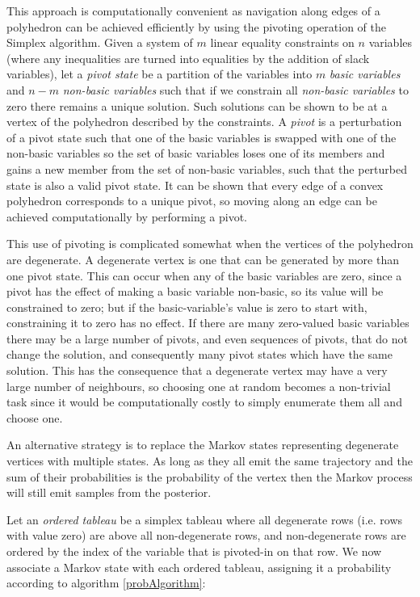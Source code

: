 \documentclass{article}
\begin{document}
This approach is computationally convenient as navigation along edges of a polyhedron can be achieved efficiently by using the pivoting operation of the Simplex algorithm\cite{dantzig1955generalized}\cite{thie2011introduction}. Given a system of $m$ linear equality constraints on $n$ variables (where any inequalities are turned into equalities by the addition of slack variables), let a \textit{pivot state} be a partition of the variables into $m$ \textit{basic variables} and $n-m$ \textit{non-basic variables} such that if we constrain all \textit{non-basic variables} to zero there remains a unique solution. Such solutions can be shown to be at a vertex of the polyhedron described by the constraints. A \textit{pivot} is a perturbation of a pivot state such that one of the basic variables is swapped with one of the non-basic variables so the set of basic variables loses one of its members and gains a new member from the set of non-basic variables, such that the perturbed state is also a valid pivot state. It can be shown that every edge of a convex polyhedron corresponds to a unique pivot, so moving along an edge can be achieved computationally by performing a pivot.

This use of pivoting is complicated somewhat when the vertices of the polyhedron are degenerate. A degenerate vertex is one that can be generated by more than one pivot state. This can occur when any of the basic variables are zero, since a pivot has the effect of making a basic variable non-basic, so its value will be constrained to zero; but if the basic-variable's value is zero to start with, constraining it to zero has no effect. If there are many zero-valued basic variables there may be a large number of pivots, and even sequences of pivots, that do not change the solution, and consequently many pivot states which have the same solution. This has the consequence that a degenerate vertex may have a very large number of neighbours, so choosing one at random becomes a non-trivial task since it would be computationally costly to simply enumerate them all and choose one\cite{gal1992new}\cite{yamada1994enumerating}.

An alternative strategy is to replace the Markov states representing degenerate vertices with multiple states. As long as they all emit the same trajectory and the sum of their probabilities is the probability of the vertex then the Markov process will still emit samples from the posterior.

Let an \textit{ordered tableau} be a simplex tableau where all degenerate rows (i.e. rows with value zero) are above all non-degenerate rows, and non-degenerate rows are ordered by the index of the variable that is pivoted-in on that row. We now associate a Markov state with each ordered tableau, assigning it a probability according to algorithm \ref{probAlgorithm}:
\end{document}
